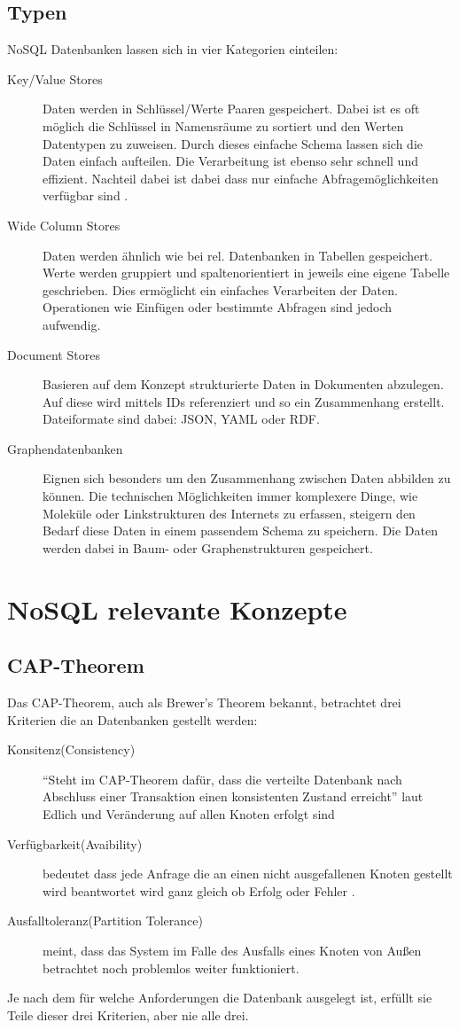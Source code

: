 \documentclass[a4paper,11pt,oneside,%
headsepline,												%
footsepline,												%
bibtotocnumbered									%
]{scrreprt}
\begin{document}
\subsection{Typen}
NoSQL Datenbanken lassen sich in vier Kategorien einteilen:
\begin{description}
   \item[Key/Value Stores] Daten werden in Schlüssel/Werte Paaren gespeichert. Dabei ist es oft möglich die Schlüssel in Namensräume zu sortiert und den Werten Datentypen zu zuweisen. Durch dieses einfache Schema lassen sich die Daten einfach aufteilen. Die Verarbeitung ist ebenso sehr schnell und effizient. Nachteil dabei ist dabei dass nur einfache Abfragemöglichkeiten verfügbar sind \autocite[131]{Edlich2010}.
   \item[Wide Column Stores] Daten werden ähnlich wie bei rel. Datenbanken in Tabellen gespeichert. Werte werden gruppiert und spaltenorientiert in jeweils eine eigene Tabelle geschrieben. Dies ermöglicht ein einfaches Verarbeiten der Daten. Operationen wie Einfügen oder bestimmte Abfragen sind jedoch aufwendig.
   \item[Document Stores] Basieren auf dem Konzept strukturierte Daten in Dokumenten abzulegen. Auf diese wird mittels IDs referenziert und so ein Zusammenhang erstellt. Dateiformate sind dabei: JSON, YAML oder RDF.
   \item[Graphendatenbanken] Eignen sich besonders um den Zusammenhang zwischen Daten abbilden zu können. Die technischen Möglichkeiten immer komplexere Dinge, wie Moleküle oder Linkstrukturen des Internets zu erfassen, steigern den Bedarf diese Daten in einem passendem Schema zu speichern. Die Daten werden dabei in Baum- oder Graphenstrukturen gespeichert.
\end{description}

\section{NoSQL relevante Konzepte}
\subsection{CAP-Theorem}
\label{CAP}
Das CAP-Theorem, auch als Brewer's Theorem bekannt, betrachtet drei Kriterien die an Datenbanken gestellt werden:
\begin{description}
\item[Konsitenz(Consistency)] \enquote{Steht im CAP-Theorem dafür, dass die verteilte Datenbank nach Abschluss einer Transaktion einen konsistenten Zustand erreicht} laut Edlich \autocite[31]{Edlich2010} und Veränderung auf allen Knoten erfolgt sind
\item[Verfügbarkeit(Avaibility)] bedeutet dass jede Anfrage die an einen nicht ausgefallenen Knoten gestellt wird beantwortet wird ganz gleich ob Erfolg oder Fehler \autocite[54]{Fowler2013}.
\item[Ausfalltoleranz(Partition Tolerance)] meint, dass das System im Falle des Ausfalls eines Knoten von Außen betrachtet noch problemlos weiter funktioniert.
\end{description}
Je nach dem für welche Anforderungen die Datenbank ausgelegt ist, erfüllt sie Teile dieser drei Kriterien, aber nie alle drei. 
\end{document}
